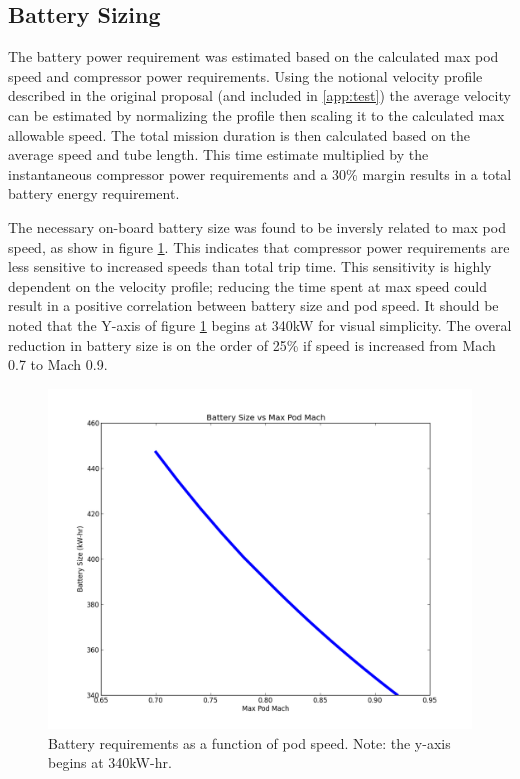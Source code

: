 \documentclass[heading.tex]{subfiles}
\begin{document}
\subsection{Battery Sizing}

The battery power requirement was estimated based on the calculated max pod speed and compressor power requirements. Using the
notional velocity profile described in the original proposal (and included in \cref{app:test}) the average velocity can be
estimated by normalizing the profile then scaling it to the calculated max allowable speed. The total mission duration is then
calculated based on the average speed and tube length. This time estimate multiplied by the instantaneous compressor
power requirements and a 30\% margin results in a total battery energy requirement.

The necessary on-board battery size was found to be inversly related to max pod speed, as show in figure \ref{f:battery}.
This indicates that compressor power requirements are less sensitive to increased speeds than total trip time. This sensitivity
is highly dependent on the velocity profile; reducing the time spent at max speed could result in a positive correlation between
battery size and pod speed. It should be noted that the Y-axis of figure \ref{f:battery} begins at 340kW for visual simplicity.
The overal reduction in battery size is on the order of 25\% if speed is increased from Mach 0.7 to Mach 0.9.

\begin{figure}[hbtp]
\centering
\includegraphics[width=\textwidth]{images/mach_vs_energy.png}
\caption[Battery requirements as a function of pod speed]{Battery requirements as a function of pod speed. Note: the y-axis begins at 340kW-hr.}
\label{f:battery}
\end{figure}
\end{document}
